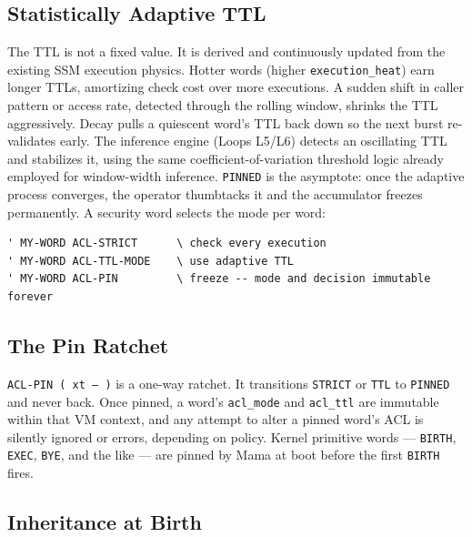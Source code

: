\subsection{Statistically Adaptive TTL}


The TTL is not a fixed value. It is derived and continuously updated from the
existing SSM execution physics. Hotter words (higher \texttt{execution\_heat})
earn longer TTLs, amortizing check cost over more executions. A sudden shift in
caller pattern or access rate, detected through the rolling window, shrinks the
TTL aggressively. Decay pulls a quiescent word's TTL back down so the next
burst re-validates early. The inference engine (Loops L5/L6) detects an
oscillating TTL and stabilizes it, using the same coefficient-of-variation
threshold logic already employed for window-width inference. \texttt{PINNED} is
the asymptote: once the adaptive process converges, the operator thumbtacks it
and the accumulator freezes permanently. A security word selects the mode per
word:

\begin{lstlisting}[language=Forth]
' MY-WORD ACL-STRICT      \ check every execution
' MY-WORD ACL-TTL-MODE    \ use adaptive TTL
' MY-WORD ACL-PIN         \ freeze -- mode and decision immutable forever
\end{lstlisting}

\subsection{The Pin Ratchet}


\texttt{ACL-PIN ( xt -- )} is a one-way ratchet. It transitions \texttt{STRICT}
or \texttt{TTL} to \texttt{PINNED} and never back. Once pinned, a word's
\texttt{acl\_mode} and \texttt{acl\_ttl} are immutable within that VM context,
and any attempt to alter a pinned word's ACL is silently ignored or errors,
depending on policy. Kernel primitive words --- \texttt{BIRTH}, \texttt{EXEC},
\texttt{BYE}, and the like --- are pinned by Mama at boot before the first
\texttt{BIRTH} fires.

\subsection{Inheritance at Birth}

